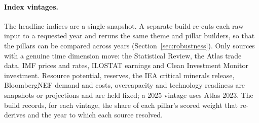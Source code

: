 \paragraph{Index vintages.} The headline indices are a single snapshot. A separate build re-cuts
each raw input to a requested year and reruns the same theme and pillar builders, so that the
pillars can be compared across years (Section~\ref{sec:robustness}). Only sources with a genuine
time dimension move: the Statistical Review, the Atlas trade data, IMF prices and rates, ILOSTAT
earnings and Clean Investment Monitor investment. Resource potential, reserves, the IEA critical
minerals release, BloombergNEF demand and costs, overcapacity and technology readiness are
snapshots or projections and are held fixed; a 2025 vintage uses Atlas 2023. The build records,
for each vintage, the share of each pillar's scored weight that re-derives and the year to which
each source resolved.
